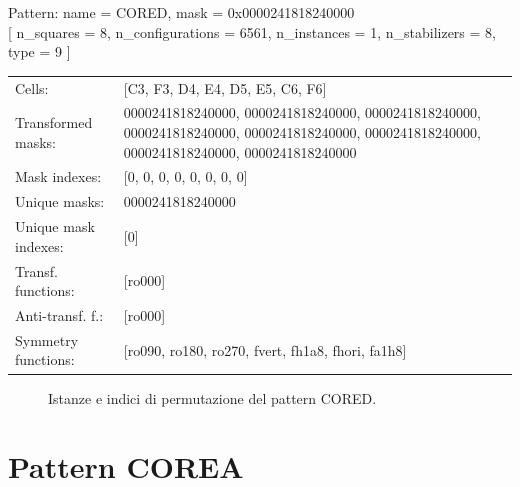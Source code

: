 \begin{tcolorbox}[sharp corners, fontupper=\ttfamily\small, colback=white]
  \noindent Pattern: name = CORED, mask = 0x0000241818240000\\
  {[} n\_squares = 8, n\_configurations = 6561,
  n\_instances = 1, n\_stabilizers = 8, type = 9 { ]}\\[1.0ex]
  \begin{tabularx}{\textwidth}{@{} p{3.5cm} X @{}}
    Cells:               & {[}C3, F3, D4, E4, D5, E5, C6, F6{]}\\[0.5ex]
    Transformed masks:   & 0000241818240000, 0000241818240000, 0000241818240000, 0000241818240000, 0000241818240000, 0000241818240000, 0000241818240000, 0000241818240000\\[0.5ex]
    Mask indexes:        & {[}0, 0, 0, 0, 0, 0, 0, 0{]}\\[0.5ex]
    Unique masks:        & 0000241818240000\\[0.5ex]
    Unique mask indexes: & {[}0{]}\\[0.5ex]
    Transf. functions:   & {[}ro000{]}\\[0.5ex]
    Anti-transf. f.:     & {[}ro000{]}\\[0.5ex]
    Symmetry functions:  & {[}ro090, ro180, ro270, fvert, fh1a8, fhori, fa1h8{]}\\[0.5ex]
  \end{tabularx}
\end{tcolorbox}

\begin{figure}[htbp]
  \centering
   \hfill
   \hfill
   \hfill
  \vspace{0.3cm}
   \hfill
   \hfill
   \hfill
  \caption{Istanze e indici di permutazione del pattern CORED.}
\end{figure}

\newpage

\section{Pattern COREA}

